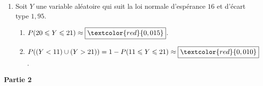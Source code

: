 \documentclass[12pt]{article}
\begin{document}
\begin{enumerate}
\item Soit $Y$ une variable aléatoire qui suit la loi normale d'espérance $16$ et d'écart type $1,95$.
	\begin{enumerate}
		\item %
		$P(20 \leqslant Y \leqslant 21)\approx \boxed{\textcolor{red}{0,015}}$.
		
		\item %
		$P((Y < 11) \cup (Y > 21))=1-P(11\leqslant Y\leqslant 21)\approx \boxed{\textcolor{red}{0,010}}$.
	\end{enumerate}
\end{enumerate}

\bigskip
	
\textbf{Partie 2}
	
	\medskip
	
%	
%	
%	

\medskip
\end{document}
